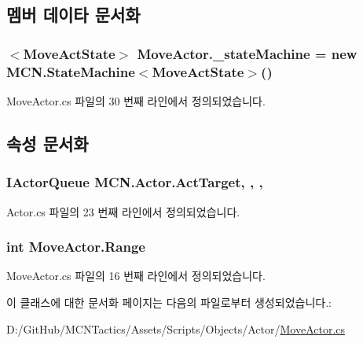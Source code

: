 \subsection{멤버 데이타 문서화}
\subsubsection[{\texorpdfstring{\+\_\+state\+Machine}{_stateMachine}}]{$<${\bf Move\+Act\+State}$>$ Move\+Actor.\+\_\+state\+Machine = new {\bf M\+C\+N.\+State\+Machine}$<${\bf Move\+Act\+State}$>$()\hspace{0.3cm}{\ttfamily [private]}}\hypertarget{class_move_actor_ab70f094ec948137a13da36afa0f673e0}{}\label{class_move_actor_ab70f094ec948137a13da36afa0f673e0}


Move\+Actor.\+cs 파일의 30 번째 라인에서 정의되었습니다.



\subsection{속성 문서화}
\subsubsection[{\texorpdfstring{Act\+Target}{ActTarget}}]{\setlength{\rightskip}{0pt plus 5cm}I\+Actor\+Queue M\+C\+N.\+Actor.\+Act\+Target\hspace{0.3cm}{\ttfamily [get]}, {}, {\ttfamily [protected]}, {\ttfamily [inherited]}}\hypertarget{class_m_c_n_1_1_actor_a1d809d2994dcccb6a8fcc665afa1ca6f}{}\label{class_m_c_n_1_1_actor_a1d809d2994dcccb6a8fcc665afa1ca6f}


Actor.\+cs 파일의 23 번째 라인에서 정의되었습니다.

\subsubsection[{\texorpdfstring{Range}{Range}}]{\setlength{\rightskip}{0pt plus 5cm}int Move\+Actor.\+Range\hspace{0.3cm}{\ttfamily [get]}}\hypertarget{class_move_actor_a4473f7867a074c8ca605220086c5d8fd}{}\label{class_move_actor_a4473f7867a074c8ca605220086c5d8fd}


Move\+Actor.\+cs 파일의 16 번째 라인에서 정의되었습니다.



이 클래스에 대한 문서화 페이지는 다음의 파일로부터 생성되었습니다.\+:\begin{DoxyCompactItemize}
\item 
D\+:/\+Git\+Hub/\+M\+C\+N\+Tactics/\+Assets/\+Scripts/\+Objects/\+Actor/\hyperlink{_move_actor_8cs}{Move\+Actor.\+cs}\end{DoxyCompactItemize}
